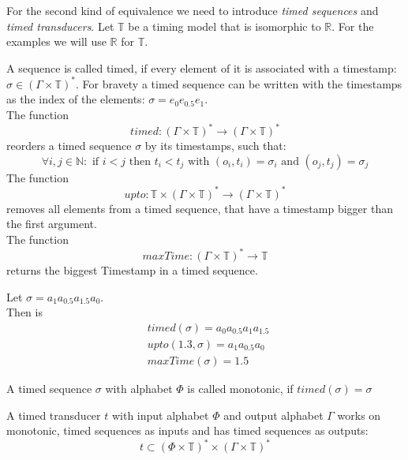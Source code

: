 For the second kind of equivalence we need to introduce \emph{timed sequences} and \emph{timed transducers}.
Let \(\mathbb{T}\) be a timing model that is isomorphic to \(\mathbb{R}\).
For the examples we will use \(\mathbb{R}\) for \(\mathbb{T}\).

\begin{definition}[name = Timed Sequence]\label{def:timed_sequence}
  A sequence is called timed, if every element of it is associated with a timestamp: \(\sigma \in {(\Gamma\times\mathbb{T})}^*\).
  For bravety a timed sequence can be written with the timestamps as the index of the elements: \(\sigma = e_0e_{0.5}e_1 \).\\
  The function
  \[\mathit{timed: } {(\Gamma \times \mathbb{T})}^* \rightarrow {(\Gamma \times \mathbb{T})}^* \]
  reorders a timed sequence \(\sigma\) by its timestamps, such that:
  \[ \forall i,j \in \mathbb{N}:\text{ if } i < j \text{ then } t_i < t_j \text{ with } (o_i, t_i) = \sigma_i \text{ and } (o_j, t_j) = \sigma_j \]
  The function
  \[\mathit{upto: } \mathbb{T} \times {(\Gamma\times\mathbb{T})}^* \rightarrow {(\Gamma\times\mathbb{T})}^*\]
  removes all elements from a timed sequence, that have a timestamp bigger than the first argument.\\
  The function
  \[\mathit{maxTime: } {(\Gamma\times\mathbb{T})}^* \rightarrow \mathbb{T} \]
  returns the biggest Timestamp in a timed sequence.
\end{definition}

\begin{exmp}[name=Functions on timed Sequences]
Let \(\sigma = a_1a_{0.5}a_{1.5}a_0\).\\
  Then is
    \begin{align*}
      &\mathit{timed} (\sigma) = a_0a_{0.5}a_1a_{1.5}\ \\
      &\mathit{upto} (1.3,\sigma) = a_1a_{0.5}a_0 \\
      &\mathit{maxTime} (\sigma) = 1.5
    \end{align*}
\end{exmp}

\begin{definition}[name = Monotonicity of Timed Sequences]\label{def:monotonicity_timed_sequences}
  A timed sequence \(\sigma\) with alphabet \(\Phi\) is called monotonic,
  if \( \mathit{timed}(\sigma) = \sigma\)
\end{definition}

\begin{definition}[name = Timed Transducer]\label{def:timed_transducer}
  A timed transducer \(t\) with input alphabet \(\Phi\) and output alphabet \(\Gamma\) works on monotonic, timed sequences as inputs and has timed sequences as outputs:
  \[t \subset {\left(\Phi \times \mathbb{T}\right)}^* \times {\left(\Gamma \times \mathbb{T}\right)}^*\]
\end{definition}


